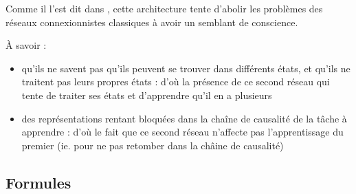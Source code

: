   Comme il l'est dit dans \cite{Cleeremans_2007}, cette architecture tente d'abolir les problèmes des réseaux connexionnistes
  classiques à avoir un semblant de conscience.
  
  À savoir :
  \begin{itemize}
   \item qu'ils ne savent pas qu'ils peuvent se trouver dans différents états, et qu'ils ne traitent pas leurs propres états : 
   d'où la présence de ce second réseau qui tente de traiter ses états et d'apprendre qu'il en a plusieurs
   \item des représentations rentant bloquées dans la chaîne de causalité de la tâche à apprendre : d'où
   le fait que ce second réseau n'affecte pas l'apprentissage du premier (ie. pour ne pas retomber dans la châine de causalité)
   \\[0.2cm]
  \end{itemize}
  

  \newpage 
  \subsection{Formules}
    
    
    




